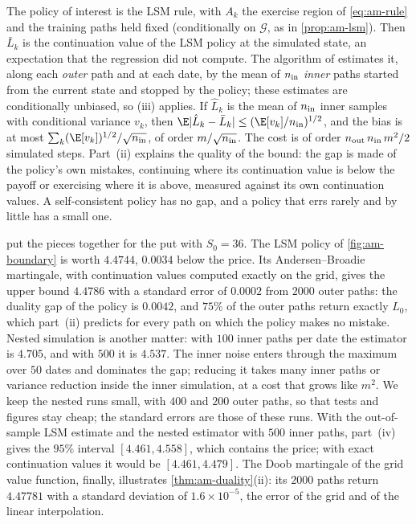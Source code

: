 The policy of interest is the LSM rule, with $A_k$ the exercise region of \eqref{eq:am-rule}
and the training paths held fixed (conditionally on $\mathcal G$, as in
\cref{prop:am-lsm}). Then $\bar L_k$ is the continuation value of the LSM policy at the
simulated state, an expectation that the regression did not compute. The algorithm of
\textcite{andersen-broadie} estimates it, along each \emph{outer} path and at each date,
by the mean of $n_{\rm in}$ \emph{inner} paths started from the current state and stopped
by the policy; these estimates are conditionally unbiased, so (iii) applies. If $\hat L_k$ is the mean of
$n_{\rm in}$ inner samples with conditional variance $v_k$, then
$\E|\hat L_k-\bar L_k|\le(\E[v_k]/n_{\rm in})^{1/2}$, and the bias is at most
$\sum_k(\E[v_k])^{1/2}/\sqrt{n_{\rm in}}$, of order $m/\sqrt{n_{\rm in}}$. The cost is of order $n_{\rm out}\,n_{\rm
in}\,m^2/2$ simulated steps. Part~(ii) explains the quality of the bound: the gap is made of
the policy's own mistakes, continuing where its continuation value is below the payoff or
exercising where it is above, measured against its own continuation values. A
self-consistent policy has no gap, and a policy that errs rarely and by little has a small one.

 put the pieces together for the put with $S_0=36$. The
LSM policy of \cref{fig:am-boundary} is worth $4.4744$, $0.0034$ below the price. Its
Andersen--Broadie martingale, with continuation values computed exactly on the grid, gives
the upper bound $4.4786$ with a standard error of $0.0002$ from $2000$ outer paths: the
duality gap of the policy is $0.0042$, and $75\%$ of the outer paths return exactly
$L_0$, which part~(ii) predicts for every path on which the policy makes no mistake. Nested
simulation is another matter: with $100$ inner paths per date the estimator is $4.705$, and
with $500$ it is $4.537$. The inner noise enters through the maximum over $50$ dates and
dominates the gap; reducing it takes many inner paths or variance reduction inside the inner
simulation, at a cost that grows like $m^2$. We keep the nested runs small, with $400$ and
$200$ outer paths, so that tests and figures stay cheap; the standard errors are those of
these runs. With the out-of-sample LSM estimate and the nested estimator with $500$ inner paths,
part~(iv) gives the $95\%$ interval $[4.461,4.558]$, which contains the price; with exact
continuation values it would be $[4.461,4.479]$. The Doob martingale of the grid value
function, finally, illustrates \cref{thm:am-duality}(ii): its $2000$ paths return
$4.47781$ with a standard deviation of $1.6\times10^{-5}$, the error of the grid and of the
linear interpolation.


